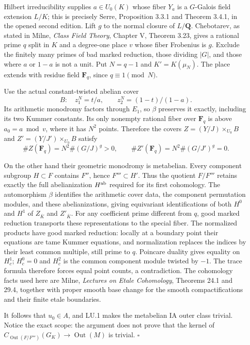 Hilbert irreducibility supplies $a\in U_0(K)$ whose fiber
$Y_a$ is a $G$-Galois field extension $L/K$; this is precisely
Serre, Proposition 3.3.1 and Theorem 3.4.1, in the opened
second edition. Lift $g$ to the normal closure of $L/\mathbf Q$.
Chebotarev, as stated in Milne, \emph{Class Field Theory},
Chapter V, Theorem 3.23, gives a rational prime $q$ split in
$K$ and a degree-one place $v$ whose fiber Frobenius is $g$.
Exclude the finitely many primes of bad marked reduction,
those dividing $|G|$, and those where $a$ or $1-a$ is not a
unit. Put $N=q-1$ and $K'=K(\mu_N)$. The place extends with
residue field $\mathbf F_q$, since $q\equiv1\pmod N$.

Use the actual constant-twisted abelian cover
\[
 B:\quad z_1^N=t/a,\qquad z_2^N=(1-t)/(1-a).
\]
Its arithmetic monodromy factors through $E_1$, so $\beta$
preserves it exactly, including its two Kummer constants.
Its only nonempty rational fiber over $\mathbf F_q$ is above
$a_0=a\bmod v$, where it has $N^2$ points. Therefore the
covers $Z=(Y/J)\times_{U_0}B$ and
$Z'=(Y/J')\times_{U_0}B$ satisfy
\[
 \#Z(\mathbf F_q)=N^2\#(G/J)^g>0,
 \qquad \#Z'(\mathbf F_q)=N^2\#(G/J')^g=0.
\]

On the other hand their geometric monodromy is metabelian.
Every component subgroup $H\subset F$ contains $F''$, hence
$F'''\subset H'$. Thus the quotient $F/F'''$ retains exactly
the full abelianization $H^{\rm ab}$ required for its first
cohomology. The automorphism $\beta$ identifies the arithmetic
cover data, the component permutation modules, and these
abelianizations, giving equivariant identifications of both
$H^0$ and $H^1$ of $Z_{\overline K}$ and $Z'_{\overline K}$.
For any coefficient prime different from $q$, good marked
reduction transports these representations to the special
fiber. The normalized products have good marked reduction:
locally at a boundary point their equations are tame Kummer
equations, and normalization replaces the indices by their
least common multiple, still prime to $q$. Poincare duality
gives equality on $H_c^1$; $H_c^0=0$ and $H_c^2$ is the
common component module twisted by $-1$. The trace formula
therefore forces equal point counts, a contradiction. The
cohomology facts used here are Milne, \emph{Lectures on Etale
Cohomology}, Theorems 24.1 and 29.4, together with proper
smooth base change for the smooth compactifications and their
finite etale boundaries.

It follows that $u_0\in A$, and LU.1 makes the metabelian IA
outer class trivial. Notice the exact scope: the argument
does not prove that the kernel of
$C_{\operatorname{Out}(F/F''')}(G_K)\to\operatorname{Out}(M)$
is trivial. \hfill$\square$

